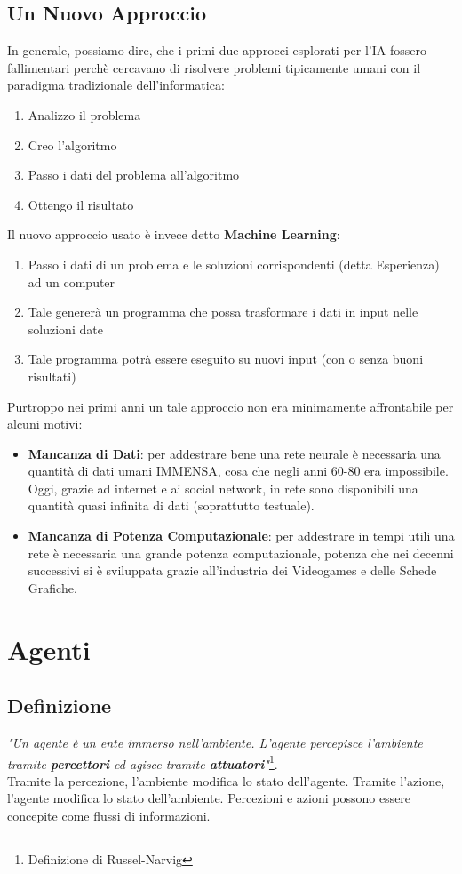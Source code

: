 \subsection{Un Nuovo Approccio}
In generale, possiamo dire, che i primi due approcci esplorati per l'IA fossero fallimentari perchè cercavano di risolvere problemi
tipicamente umani con il paradigma tradizionale dell'informatica:
\begin{enumerate}
    \item Analizzo il problema
    \item Creo l'algoritmo
    \item Passo i dati del problema all'algoritmo
    \item Ottengo il risultato
\end{enumerate}
Il nuovo approccio usato è invece detto \textbf{Machine Learning}:
\begin{enumerate}
    \item Passo i dati di un problema e le soluzioni corrispondenti (detta Esperienza) ad un computer
    \item Tale genererà un programma che possa trasformare i dati in input nelle soluzioni date
    \item Tale programma potrà essere eseguito su nuovi input (con o senza buoni risultati)
\end{enumerate}
Purtroppo nei primi anni un tale approccio non era minimamente affrontabile per alcuni motivi:
\begin{itemize}
    \item \textbf{Mancanza di Dati}: per addestrare bene una rete neurale è necessaria una quantità di dati umani IMMENSA, cosa che negli anni 60-80 era impossibile.
    Oggi, grazie ad internet e ai social network, in rete sono disponibili una quantità quasi infinita di dati (soprattutto testuale).
    \item \textbf{Mancanza di Potenza Computazionale}: per addestrare in tempi utili una rete è necessaria una grande potenza computazionale, potenza che nei decenni successivi
    si è sviluppata grazie all'industria dei Videogames e delle Schede Grafiche.
\end{itemize}

\section{Agenti}
\subsection{Definizione}
\textit{"Un agente è un ente immerso nell'ambiente. L'agente percepisce l'ambiente tramite \textbf{percettori} ed agisce tramite \textbf{attuatori}"}\footnote{Definizione di Russel-Narvig}.\\
Tramite la percezione, l'ambiente modifica lo stato dell'agente. Tramite l'azione, l'agente modifica lo stato dell'ambiente. Percezioni e azioni possono essere concepite come flussi di informazioni.
